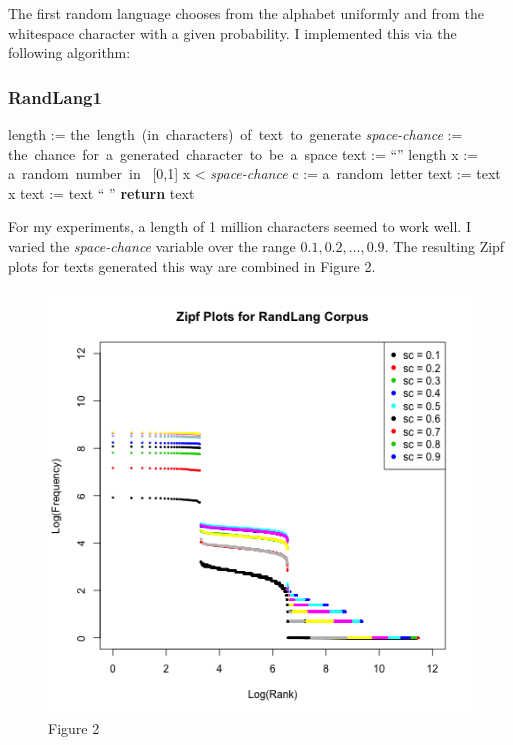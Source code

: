 \documentclass{article}
\begin{document}
The first random language chooses from the alphabet uniformly and from the whitespace character with a given probability. I implemented this via the following algorithm:
\vspace{0.4cm}
\subsubsection*{RandLang1}
\begin{adjustwidth}{1cm}{}\begin{programbox}
length := \mbox{the length (in characters) of text to generate}
\textit{space-chance} := \mbox{the chance for a generated character to be a space}
text := ``''
 \TO length \DO
  x := \mbox{a random number in } [0,1]
  \IF x < \textit{space-chance}
    \THEN c := \mbox{a random letter}
      text := text \concat x
    \ELSE text := text \concat `` ''
  \FI
\OD
\textbf{return } text
\end{programbox}\end{adjustwidth}
 \vspace{0.6cm}

For my experiments, a length of 1 million characters seemed to work well. I varied the \textit{space-chance} variable over the range $  0.1, 0.2, \dots, 0.9  $. The resulting Zipf plots for texts generated this way are combined in Figure 2.


\begin{figure}[h]
\centering
\includegraphics[width=13cm,keepaspectratio]{randlang-combined.png}
\captionsetup{labelformat=empty} \caption{Figure 2}
\end{figure}
\end{document}
